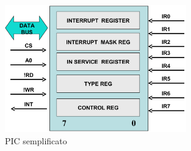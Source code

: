 

\begin{figure}[ht]
    \centering
    \includegraphics[width=0.7\textwidth]{img/easy_pic.png}
    \caption{PIC semplificato}
    \label{img:piceasy}
\end{figure}

